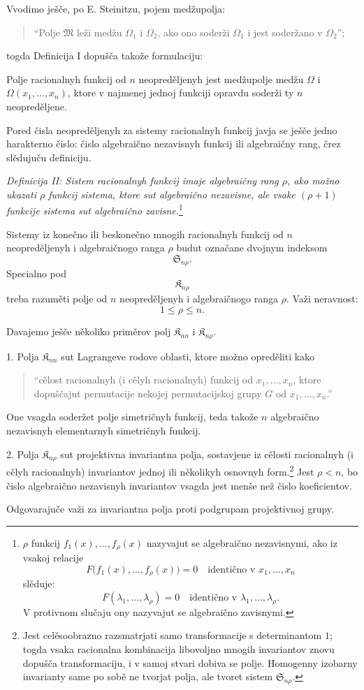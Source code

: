\documentclass[11pt]{article}
\providecommand{\Kfield}{\mathfrak{K}}
\providecommand{\Ssys}{\mathfrak{S}}
\providecommand{\Mfield}{\mathfrak{M}}
\begin{document}
Vvodimo ješče, po E. Steinitzu, pojem medžupolja:
\begin{quote}
``Polje $\Mfield$ leži medžu $\Omega_1$ i $\Omega_2$, ako ono soderži $\Omega_1$ i jest soderžano v $\Omega_2$'';
\end{quote}
togda Definicija I dopušča takože formulaciju:

Polje racionalnyh funkcij od $n$ neopreděljenyh jest medžupolje medžu $\Omega$ i $\Omega(x_1,\ldots,x_n)$, ktore v najmenej jednoj funkciji opravdu soderži ty $n$ neopreděljene.

Pored čisla neopreděljenyh za sistemy racionalnyh funkcij javja se ješče jedno harakterno čislo: čislo algebraično nezavisnyh funkcij ili algebraičny rang, črez slědujuču definiciju.

{\itshape Definicija II: Sistem racionalnyh funkcij imaje algebraičny rang $\rho$, ako možno ukazati $\rho$ funkcij sistema, ktore sut algebraično nezavisne, ale vsake $(\rho+1)$ funkcije sistema sut algebraično zavisne.}\footnote{$\rho$ funkcij $f_1(x),\ldots,f_\rho(x)$ nazyvajut se algebraično nezavisnymi, ako iz vsakoj relacije
\[
F\bigl(f_1(x),\ldots,f_\rho(x)\bigr)=0\quad\text{identično v }x_1,\ldots,x_n
\]
slěduje:
\[
F(\lambda_1,\ldots,\lambda_\rho)=0\quad\text{identično v }\lambda_1,\ldots,\lambda_\rho.
\]
V protivnom slučaju ony nazyvajut se algebraično zavisnymi.}

Sistemy iz konečno ili beskonečno mnogih racionalnyh funkcij od $n$ neopreděljenyh i algebraičnogo ranga $\rho$ budut označane dvojnym indeksom
\[
  \Ssys_{n\rho}.
\]
Specialno pod
\[
  \Kfield_{n\rho}
\]
treba razuměti polje od $n$ neopreděljenyh i algebraičnogo ranga $\rho$. Važi neravnost:
\[
  1\leq \rho\leq n.
\]

Davajemo ješče několiko priměrov polj $\Kfield_{nn}$ i $\Kfield_{n\rho}$.

1. Polja $\Kfield_{nn}$ sut Lagrangeve rodove oblasti, ktore možno opreděliti kako
\begin{quote}
``cělost racionalnyh (i cělyh racionalnyh) funkcij od $x_1,\ldots,x_n$, ktore dopuščajut permutacije nekojej permutacijskoj grupy $G$ od $x_1,\ldots,x_n$.''
\end{quote}
One vsagda soderžet polje simetričnyh funkcij, teda takože $n$ algebraično nezavisnyh elementarnyh simetričnyh funkcij.

2. Polja $\Kfield_{n\rho}$ sut projektivna invariantna polja, sostavjene iz cělosti racionalnyh (i cělyh racionalnyh) invariantov jednoj ili několikyh osnovnyh form.\footnote{Jest celěsoobrazno razsmatrjati samo transformacije s determinantom $1$; togda vsaka racionalna kombinacija libovoljno mnogih invariantov znovu dopušča transformaciju, i v samoj stvari dobiva se polje. Homogenny izobarny invarianty same po sobě ne tvorjat polja, ale tvoret sistem $\Ssys_{n\rho}$.} Jest $\rho<n$, bo čislo algebraično nezavisnyh invariantov vsagda jest menše než čislo koeficientov.

Odgovarajuče važi za invariantna polja proti podgrupam projektivnoj grupy.
\end{document}
